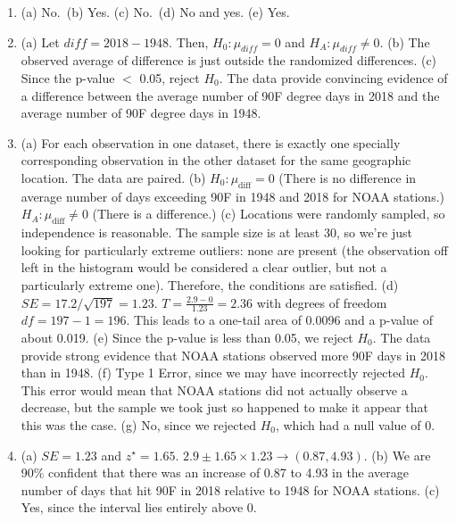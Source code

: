 \documentclass[
  10pt,
  openany]{book}
\begin{document}
\begin{enumerate}
  \addtocounter{enumi}{1}
\item
  (a) No.~(b) Yes. (c) No.~(d) No and yes. (e) Yes.

  \addtocounter{enumi}{1}
\item
  (a) Let \(diff = 2018 - 1948\). Then, \(H_0: \mu_{diff} = 0\) and \(H_A: \mu_{diff} \ne 0\). (b) The observed average of difference is just outside the randomized differences. (c) Since the p-value \(<\) 0.05, reject \(H_0\). The data provide convincing evidence of a difference between the average number of 90F degree days in 2018 and the average number of 90F degree days in 1948.

  \addtocounter{enumi}{1}
\item
  (a) For each observation in one dataset, there is exactly one specially corresponding observation in the other dataset for the same geographic location. The data are paired. (b) \(H_0: \mu_{\text{diff}} = 0\) (There is no difference in average number of days exceeding 90F in 1948 and 2018 for NOAA stations.) \(H_A: \mu_{\text{diff}} \neq 0\) (There is a difference.) (c) Locations were randomly sampled, so independence is reasonable. The sample size is at least 30, so we're just looking for particularly extreme outliers: none are present (the observation off left in the histogram would be considered a clear outlier, but not a particularly extreme one). Therefore, the conditions are satisfied. (d) \(SE = 17.2 / \sqrt{197} = 1.23\). \(T = \frac{2.9 - 0}{1.23} = 2.36\) with degrees of freedom \(df = 197 - 1 = 196\). This leads to a one-tail area of 0.0096 and a p-value of about 0.019. (e) Since the p-value is less than 0.05, we reject \(H_0\). The data provide strong evidence that NOAA stations observed more 90F days in 2018 than in 1948. (f) Type 1 Error, since we may have incorrectly rejected \(H_0\). This error would mean that NOAA stations did not actually observe a decrease, but the sample we took just so happened to make it appear that this was the case. (g) No, since we rejected \(H_0\), which had a null value of 0.

  \addtocounter{enumi}{1}
\item
  (a) \(SE = 1.23\) and \(z^{\star} = 1.65\). \(2.9 \pm 1.65 \times 1.23 \to (0.87, 4.93)\). (b) We are 90\% confident that there was an increase of 0.87 to 4.93 in the average number of days that hit 90F in 2018 relative to 1948 for NOAA stations. (c) Yes, since the interval lies entirely above 0.


\end{enumerate}
\end{document}
